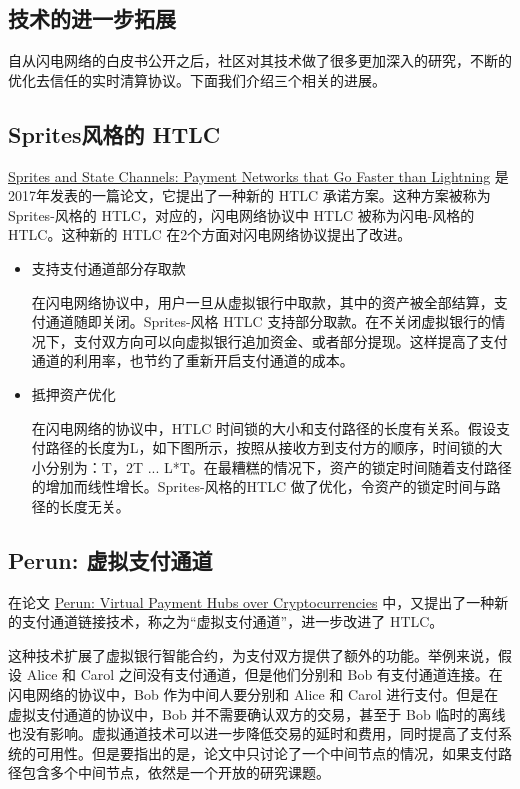\begin{appendices}
\section{技术的进一步拓展}
自从闪电网络的白皮书公开之后，社区对其技术做了很多更加深入的研究，不断的优化去信任的实时清算协议。下面我们介绍三个相关的进展。

\subsection{Sprites风格的 HTLC}
\href{https://arxiv.org/abs/1702.05812}{Sprites and State Channels: Payment Networks that Go Faster than Lightning} 是2017年发表的一篇论文，它提出了一种新的 HTLC 承诺方案。这种方案被称为 Sprites-风格的 HTLC，对应的，闪电网络协议中 HTLC 被称为闪电-风格的HTLC。这种新的 HTLC 在2个方面对闪电网络协议提出了改进。

\begin{itemize}
    \item 支持支付通道部分存取款

    在闪电网络协议中，用户一旦从虚拟银行中取款，其中的资产被全部结算，支付通道随即关闭。Sprites-风格 HTLC 支持部分取款。在不关闭虚拟银行的情况下，支付双方向可以向虚拟银行追加资金、或者部分提现。这样提高了支付通道的利用率，也节约了重新开启支付通道的成本。

    \item 抵押资产优化

    在闪电网络的协议中，HTLC 时间锁的大小和支付路径的长度有关系。假设支付路径的长度为L，如下图所示，按照从接收方到支付方的顺序，时间锁的大小分别为：T，2T ... L*T。在最糟糕的情况下，资产的锁定时间随着支付路径的增加而线性增长。Sprites-风格的HTLC 做了优化，令资产的锁定时间与路径的长度无关。
\end{itemize}

\subsection{Perun: 虚拟支付通道}
在论文 \href{https://eprint.iacr.org/2017/635.pdf}{Perun: Virtual Payment Hubs over Cryptocurrencies} 中，又提出了一种新的支付通道链接技术，称之为“虚拟支付通道”，进一步改进了 HTLC。

这种技术扩展了虚拟银行智能合约，为支付双方提供了额外的功能。举例来说，假设 Alice 和 Carol 之间没有支付通道，但是他们分别和 Bob 有支付通道连接。在闪电网络的协议中，Bob 作为中间人要分别和 Alice 和 Carol 进行支付。但是在虚拟支付通道的协议中，Bob 并不需要确认双方的交易，甚至于 Bob 临时的离线也没有影响。虚拟通道技术可以进一步降低交易的延时和费用，同时提高了支付系统的可用性。但是要指出的是，论文中只讨论了一个中间节点的情况，如果支付路径包含多个中间节点，依然是一个开放的研究课题。


\end{appendices}
